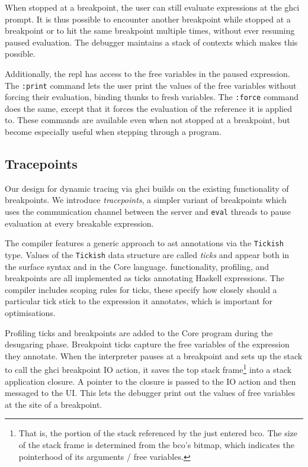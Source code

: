 \documentclass[thesis=B,english]{FITthesis}[2019/12/23]
\newcommand{\hsType}[1]{\texttt{#1}}
\begin{document}
When stopped at a breakpoint, the user can still evaluate expressions at the
\acrshort{ghci} prompt. It is thus possible to encounter another breakpoint
while stopped at a breakpoint or to hit the same breakpoint multiple times,
without ever resuming paused evaluation. The debugger maintains a stack of
contexts which makes this possible.

Additionally, the \acrshort{repl} has access to the free variables in the
paused expression. The \texttt{:print} command lets the user print the values
of the free variables without forcing their evaluation, binding thunks to fresh
variables. The \texttt{:force} command does the same, except that it forces the
evaluation of the reference it is applied to. These commands are available even
when not stopped at a breakpoint, but become especially useful when stepping
through a program.

\subsection*{Trace\-points}
Our design for dynamic tracing via \acrshort{ghci} builds on the existing
functionality of breakpoints. We introduce \textit{trace\-points}, a simpler
variant of breakpoints which uses the communication channel between the server
and \texttt{eval} threads to pause evaluation at every breakable expression.

The compiler features a generic approach to \acrshort{ast} annotations via the
\hsType{Tickish} type. Values of the \hsType{Tickish} data structure are called
\textit{ticks} and appear both in the surface syntax and in the Core language.
 functionality, profiling, and breakpoints are all implemented
as ticks annotating Haskell expressions. The compiler includes scoping rules
for ticks, these specify how closely should a particular tick stick to the
expression it annotates, which is important for optimisations.

Profiling ticks and breakpoints are added to the Core program during the
desugaring phase. Breakpoint ticks capture the free variables of the expression
they annotate. When the interpreter pauses at a breakpoint and sets up the
stack to call the \acrshort{ghci} breakpoint IO action, it saves the top stack
frame\footnote{
	That is, the portion of the stack referenced by the just entered
	\acrshort{bco}. The size of the stack frame is determined from the
	\acrshort{bco}'s bitmap, which indicates the pointerhood of its arguments /
	free variables.
} into a stack application closure. A pointer to the closure is passed to the
IO action and then messaged to the UI. This lets the debugger print out the
values of free variables at the site of a breakpoint.
\end{document}
